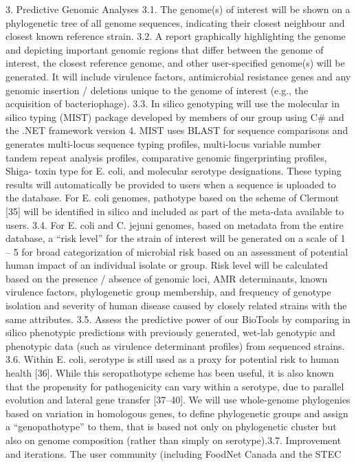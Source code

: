 \documentclass{bmcart}
\begin{document}
3. Predictive Genomic Analyses
3.1. The genome(s) of interest will be shown on a phylogenetic tree of all genome sequences,
indicating their closest neighbour and closest known reference strain.
3.2. A report graphically highlighting the genome and depicting important genomic regions that
differ between the genome of interest, the closest reference genome, and other user-specified
genome(s) will be generated. It will include virulence factors, antimicrobial resistance genes
and any genomic insertion / deletions unique to the genome of interest (e.g., the acquisition of
bacteriophage).
3.3. In silico genotyping will use the molecular in silico typing (MIST) package developed by
members of our group using C# and the .NET framework version 4. MIST uses BLAST for
sequence comparisons and generates multi-locus sequence typing profiles, multi-locus variable
number tandem repeat analysis profiles, comparative genomic fingerprinting profiles, Shiga-
toxin type for E. coli, and molecular serotype designations. These typing results will
automatically be provided to users when a sequence is uploaded to the database. For E. coli
genomes, pathotype based on the scheme of Clermont [35] will be identified in silico and
included as part of the meta-data available to users.
3.4. For E. coli and C. jejuni genomes, based on metadata from the entire database, a “risk level”
for the strain of interest will be generated on a scale of 1 – 5 for broad categorization of
microbial risk based on an assessment of potential human impact of an individual isolate or
group. Risk level will be calculated based on the presence / absence of genomic loci, AMR
determinants, known virulence factors, phylogenetic group membership, and frequency of
genotype isolation and severity of human disease caused by closely related strains with the
same attributes.
3.5. Assess the predictive power of our BioTools by comparing in silico phenotypic predictions
with previously generated, wet-lab genotypic and phenotypic data (such as virulence
determinant profiles) from sequenced strains.
3.6. Within E. coli, serotype is still used as a proxy for potential risk to human health [36]. While
this seropathotype scheme has been useful, it is also known that the propensity for
pathogenicity can vary within a serotype, due to parallel evolution and lateral gene transfer
[37–40]. We will use whole-genome phylogenies based on variation in homologous genes, to
define phylogenetic groups and assign a “genopathotype” to them, that is based not only on
phylogenetic cluster but also on genome composition (rather than simply on serotype).3.7. Improvement and iterations. The user community (including FoodNet Canada and the STEC
\end{document}
